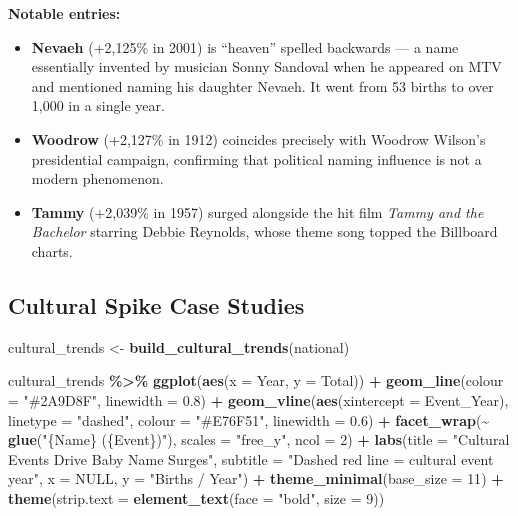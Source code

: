 \documentclass[
]{article}
\newenvironment{Shaded}{\begin{snugshade}}{\end{snugshade}}
\newcommand{\AttributeTok}[1]{\textcolor[rgb]{0.13,0.29,0.53}{#1}}
\newcommand{\ConstantTok}[1]{\textcolor[rgb]{0.56,0.35,0.01}{#1}}
\newcommand{\DecValTok}[1]{\textcolor[rgb]{0.00,0.00,0.81}{#1}}
\newcommand{\FloatTok}[1]{\textcolor[rgb]{0.00,0.00,0.81}{#1}}
\newcommand{\FunctionTok}[1]{\textcolor[rgb]{0.13,0.29,0.53}{\textbf{#1}}}
\newcommand{\NormalTok}[1]{#1}
\newcommand{\OtherTok}[1]{\textcolor[rgb]{0.56,0.35,0.01}{#1}}
\newcommand{\SpecialCharTok}[1]{\textcolor[rgb]{0.81,0.36,0.00}{\textbf{#1}}}
\newcommand{\StringTok}[1]{\textcolor[rgb]{0.31,0.60,0.02}{#1}}
\providecommand{\tightlist}{%
  \setlength{\itemsep}{0pt}\setlength{\parskip}{0pt}}
\begin{document}
\textbf{Notable entries:}

\begin{itemize}
\tightlist
\item
  \textbf{Nevaeh} (+2,125\% in 2001) is ``heaven'' spelled backwards ---
  a name essentially invented by musician Sonny Sandoval when he
  appeared on MTV and mentioned naming his daughter Nevaeh. It went from
  53 births to over 1,000 in a single year.
\item
  \textbf{Woodrow} (+2,127\% in 1912) coincides precisely with Woodrow
  Wilson's presidential campaign, confirming that political naming
  influence is not a modern phenomenon.
\item
  \textbf{Tammy} (+2,039\% in 1957) surged alongside the hit film
  \emph{Tammy and the Bachelor} starring Debbie Reynolds, whose theme
  song topped the Billboard charts.
\end{itemize}

\subsection{Cultural Spike Case
Studies}\label{cultural-spike-case-studies}

\begin{Shaded}
\begin{Highlighting}[]
\NormalTok{cultural\_trends }\OtherTok{\textless{}{-}} \FunctionTok{build\_cultural\_trends}\NormalTok{(national)}

\NormalTok{cultural\_trends }\SpecialCharTok{\%\textgreater{}\%}
    \FunctionTok{ggplot}\NormalTok{(}\FunctionTok{aes}\NormalTok{(}\AttributeTok{x =}\NormalTok{ Year, }\AttributeTok{y =}\NormalTok{ Total)) }\SpecialCharTok{+}
    \FunctionTok{geom\_line}\NormalTok{(}\AttributeTok{colour =} \StringTok{"\#2A9D8F"}\NormalTok{, }\AttributeTok{linewidth =} \FloatTok{0.8}\NormalTok{) }\SpecialCharTok{+}
    \FunctionTok{geom\_vline}\NormalTok{(}\FunctionTok{aes}\NormalTok{(}\AttributeTok{xintercept =}\NormalTok{ Event\_Year), }\AttributeTok{linetype =} \StringTok{"dashed"}\NormalTok{,}
               \AttributeTok{colour =} \StringTok{"\#E76F51"}\NormalTok{, }\AttributeTok{linewidth =} \FloatTok{0.6}\NormalTok{) }\SpecialCharTok{+}
    \FunctionTok{facet\_wrap}\NormalTok{(}\SpecialCharTok{\textasciitilde{}} \FunctionTok{glue}\NormalTok{(}\StringTok{"\{Name\} (\{Event\})"}\NormalTok{), }\AttributeTok{scales =} \StringTok{"free\_y"}\NormalTok{, }\AttributeTok{ncol =} \DecValTok{2}\NormalTok{) }\SpecialCharTok{+}
    \FunctionTok{labs}\NormalTok{(}\AttributeTok{title =} \StringTok{"Cultural Events Drive Baby Name Surges"}\NormalTok{,}
         \AttributeTok{subtitle =} \StringTok{"Dashed red line = cultural event year"}\NormalTok{,}
         \AttributeTok{x =} \ConstantTok{NULL}\NormalTok{, }\AttributeTok{y =} \StringTok{"Births / Year"}\NormalTok{) }\SpecialCharTok{+}
    \FunctionTok{theme\_minimal}\NormalTok{(}\AttributeTok{base\_size =} \DecValTok{11}\NormalTok{) }\SpecialCharTok{+}
    \FunctionTok{theme}\NormalTok{(}\AttributeTok{strip.text =} \FunctionTok{element\_text}\NormalTok{(}\AttributeTok{face =} \StringTok{"bold"}\NormalTok{, }\AttributeTok{size =} \DecValTok{9}\NormalTok{))}
\end{Highlighting}
\end{Shaded}
\end{document}

